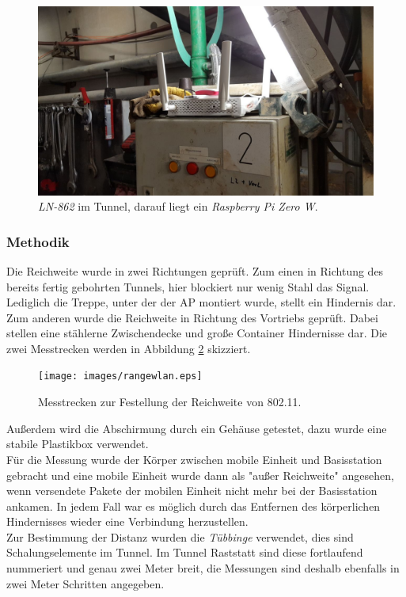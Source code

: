\begin{figure}[h]
  \centering
	\includegraphics[width=\textwidth]{images/applacement.jpg}
  \caption{\emph{LN-862} im Tunnel, darauf liegt ein \emph{Raspberry Pi Zero W}.}
  \label{fig:applacement}
\end{figure}

\subsubsection{Methodik}
Die Reichweite wurde in zwei Richtungen geprüft.
Zum einen in Richtung des bereits fertig gebohrten Tunnels, hier blockiert nur wenig Stahl das Signal. 
Lediglich die Treppe, unter der der AP montiert wurde, stellt ein Hindernis dar.
Zum anderen wurde die Reichweite in Richtung des Vortriebs geprüft.
Dabei stellen eine stählerne Zwischendecke und große Container Hindernisse dar.
Die zwei Messtrecken werden in Abbildung \ref{fig:rangewlan} skizziert.

\begin{figure}[h!]
  \centering
	\texttt{[image: images/rangewlan.eps]}
  \caption{Messtrecken zur Festellung der Reichweite von 802.11.}
  \label{fig:rangewlan}
\end{figure}

Außerdem wird die Abschirmung durch ein Gehäuse getestet, dazu wurde eine stabile Plastikbox verwendet.\\
Für die Messung wurde der Körper zwischen mobile Einheit und Basisstation gebracht und eine mobile Einheit wurde dann als "{}außer Reichweite"{} angesehen, wenn versendete Pakete der mobilen Einheit nicht mehr bei der Basisstation ankamen.
In jedem Fall war es möglich durch das Entfernen des körperlichen Hindernisses wieder eine Verbindung herzustellen.\\
Zur Bestimmung der Distanz wurden die \emph{Tübbinge} verwendet, dies sind Schalungselemente im Tunnel.
Im Tunnel Raststatt sind diese fortlaufend nummeriert und genau zwei Meter breit, die Messungen sind deshalb ebenfalls in zwei Meter Schritten angegeben.

